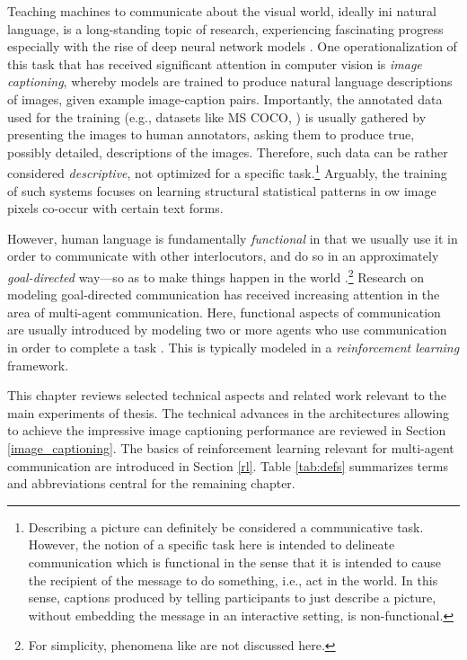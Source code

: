 Teaching machines to communicate about the visual world, ideally ini natural language, is a long-standing topic of research, experiencing fascinating progress especially with the rise of deep neural network models \parencite{lecun2015deep, lake2017building}. 
One operationalization of this task that has received significant attention in computer vision is \textit{image captioning}, whereby models are trained to produce natural language descriptions of images, given example image-caption pairs. Importantly, the annotated data used for the training (e.g., datasets like MS COCO, \cite{chen2015microsoft}) is usually gathered by presenting the images to human annotators, asking them to produce true, possibly detailed, descriptions of the images. Therefore, such data can be rather considered \textit{descriptive}, not optimized for a specific task.\footnote{Describing a picture can definitely be considered a communicative task. However, the notion of a specific task here is intended to delineate communication which is functional in the sense that it is intended to cause the recipient of the message to do something, i.e., act in the world.  In this sense, captions produced by telling participants to just describe a picture, without embedding the message in an interactive setting, is non-functional.} Arguably, the training of such systems focuses on learning structural statistical patterns in ow image pixels co-occur with certain text forms.

However, human language is fundamentally \textit{functional} in that we usually use it in order to communicate with other interlocutors, and do so in an approximately \textit{goal-directed} way---so as to make things happen in the world \parencite[e.g., ][]{wittgenstein2010philosophical, clark1996using}.\footnote{For simplicity, phenomena like  are not discussed here.} 
Research on modeling goal-directed communication has received increasing attention in the area of multi-agent communication. Here, functional aspects of communication are usually introduced by modeling two or more agents who use communication in order to complete a task \parencite{lazaridou2020multi}. This is typically modeled in a \textit{reinforcement learning} framework. 

This chapter reviews selected technical aspects and related work relevant to the main experiments of thesis. The technical advances in the architectures allowing to achieve the impressive image captioning performance are reviewed in Section \ref{image_captioning}. The basics of reinforcement learning relevant for multi-agent communication are introduced in Section \ref{rl}. Table \ref{tab:defs} summarizes terms and abbreviations central for the remaining chapter. 


